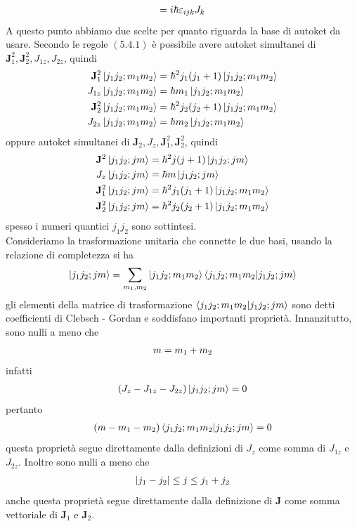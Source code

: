 \documentclass{article}
\begin{document}
\begin{gather}
    [J_i, J_j] = i\hbar\varepsilon_{ijk}J_k \notag
\end{gather}
A questo punto abbiamo due scelte per quanto riguarda la base di autoket da usare. Secondo le regole $(5.4.1)$ è possibile avere autoket simultanei di $\mathbf{J}_1^2, \mathbf{J}_2^2, J_{1z}, J_{2z}$, quindi
\begin{align}
    \mathbf{J}_1^2\ket{j_1j_2; m_1m_2} &= \hbar^2j_1(j_1+1)\ket{j_1j_2; m_1m_2} \notag \\
    J_{1z}\ket{j_1j_2; m_1m_2} &= \hbar m_1\ket{j_1j_2; m_1m_2} \notag \\
    \mathbf{J}_2^2\ket{j_1j_2; m_1m_2} &= \hbar^2j_2(j_2+1)\ket{j_1j_2; m_1m_2} \notag \\
    J_{2z}\ket{j_1j_2; m_1m_2} &= \hbar m_2\ket{j_1j_2; m_1m_2} \notag
\end{align}
oppure autoket simultanei di $\mathbf{J}_2, J_z, \mathbf{J}_1^2, \mathbf{J}_2^2$, quindi
\begin{align}
    \mathbf{J}^2\ket{j_1j_2; jm} &= \hbar^2j(j+1)\ket{j_1j_2; jm} \notag \\
    J_z\ket{j_1j_2; jm} &= \hbar m\ket{j_1j_2; jm} \notag \\
    \mathbf{J}_1^2\ket{j_1j_2; jm} &= \hbar^2j_1(j_1+1)\ket{j_1j_2; m_1m_2} \notag \\
    \mathbf{J}_2^2\ket{j_1j_2; jm} &= \hbar^2j_2(j_2+1)\ket{j_1j_2; m_1m_2} \notag
\end{align}
spesso i numeri quantici $j_1j_2$ sono sottintesi. \\
Consideriamo la trasformazione unitaria che connette le due basi, usando la relazione di completezza si ha
\begin{gather}
    \ket{j_1j_2; jm} = \sum_{m_1, m_2} \ket{j_1j_2; m_1m_2}\braket{j_1j_2; m_1m_2|j_1j_2; jm} \notag 
\end{gather}
gli elementi della matrice di trasformazione $\braket{j_1j_2; m_1m_2|j_1j_2; jm}$ sono detti coefficienti di Clebsch - Gordan e soddisfano importanti proprietà. Innanzitutto, sono nulli a meno che
\begin{gather}
    m = m_1 + m_2 \notag
\end{gather}
infatti
\begin{gather}
    (J_z - J_{1z} - J_{2z})\ket{j_1j_2; jm} = 0 \notag
\end{gather}
pertanto
\begin{gather}
    (m - m_1 - m_2)\braket{j_1j_2; m_1m_2|j_1j_2; jm} = 0 \notag
\end{gather}
questa proprietà segue direttamente dalla definizioni di $J_z$ come somma di $J_{1z}$ e $J_{2z}$. Inoltre sono nulli a meno che
\begin{gather}
    |j_1 - j_2| \leq j \leq j_1 + j_2 \notag
\end{gather}
anche questa proprietà segue direttamente dalla definizione di $\mathbf{J}$ come somma vettoriale di $\mathbf{J}_1$ e $\mathbf{J}_2$.
\end{document}
